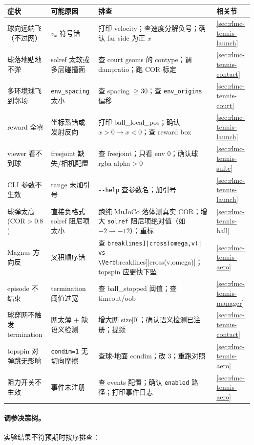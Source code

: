\begin{center}
\small
\begin{tabular}{@{}p{3.4cm}p{3.2cm}p{4.4cm}l@{}}
\toprule
症状 & 可能原因 & 排查 & 相关节 \\
\midrule
球向远端飞（不过网） & $v_x$ 符号错 & 打印 velocity；查速度分解负号；确认 far side 为正 $x$ & \cref{sec:rlmc-tennis-launch} \\
球落地贴地不弹 & solref 太软或多层碰撞面 & 查 court geoms 的 contype；调 dampratio；跑 COR 标定 & \cref{sec:rlmc-tennis-contact} \\
多环境球飞到邻场 & \verb|env_spacing| 太小 & 查 spacing $\ge30$；查 \verb|env_origins| 偏移 & \cref{sec:rlmc-tennis-court} \\
reward 全零 & 坐标系错或发射反向 & 打印 ball\_local\_pos；确认 $x>0\to x<0$；查 reward box & \cref{sec:rlmc-tennis-launch} \\
viewer 看不到球 & freejoint 缺失/相机配置 & 查 freejoint；只看 env 0；确认球 rgba alpha$>0$ & \cref{sec:rlmc-tennis-suite} \\
CLI 参数不生效 & range 未加引号 & \verb|--help| 查参数名；加引号 & \cref{sec:rlmc-tennis-launch} \\
球弹太高(COR$>0.8$) & 直接负格式 solref 阻尼项太小 & 跑纯 MuJoCo 落体测真实 COR；增大 \verb|solref| 阻尼项绝对值（如 $-2\to-12$）；重标 & \cref{sec:rlmc-tennis-ball} \\
Magnus 方向反 & 叉积顺序错 & 查 \Verb[breaklines]|cross(omega,v)| vs \Verb[breaklines]|cross(v,omega)|；topspin 应更快下坠 & \cref{sec:rlmc-tennis-aero} \\
episode 不结束 & termination 阈值过宽 & 查 ball\_stopped 阈值；查 timeout/oob & \cref{sec:rlmc-tennis-manager} \\
球穿网不触发 termination & 网太薄 $+$ 缺语义检测 & 增大网 size[0]；确认语义检测已注册；提频 & \cref{sec:rlmc-tennis-contact} \\
topspin 对弹跳无影响 & \verb|condim=1| 无切向摩擦 & 查球-地面 condim；改 $3$；重跑对照 & \cref{sec:rlmc-tennis-aero} \\
阻力开关不生效 & 事件未注册 & 查 events 配置；确认 \verb|enabled| 路径；打印事件日志 & \cref{sec:rlmc-tennis-aero} \\
\bottomrule
\end{tabular}
\end{center}

\paragraph{调参决策树。}实验结果不符预期时按序排查：


